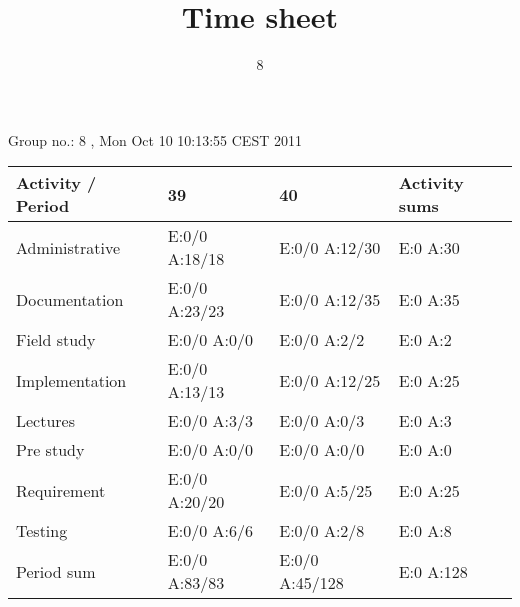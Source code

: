 \documentclass[a4paper]{article}
\title{Time sheet}
\author{8}
\begin{document}
\begin{landscape}
\begin{center}
	Group no.: 8
	, Mon Oct 10 10:13:55 CEST 2011

	\begin{tabular}{| l | l | l | l |}
		\hline
		Activity / Period & 39 & 40 & Activity sums \\
		\hline \hline
		
Administrative & E:0/0 A:18/18 & E:0/0 A:12/30 & E:0 A:30 \\
Documentation & E:0/0 A:23/23 & E:0/0 A:12/35 & E:0 A:35 \\
Field study & E:0/0 A:0/0 & E:0/0 A:2/2 & E:0 A:2 \\
Implementation & E:0/0 A:13/13 & E:0/0 A:12/25 & E:0 A:25 \\
Lectures & E:0/0 A:3/3 & E:0/0 A:0/3 & E:0 A:3 \\
Pre study & E:0/0 A:0/0 & E:0/0 A:0/0 & E:0 A:0 \\
Requirement & E:0/0 A:20/20 & E:0/0 A:5/25 & E:0 A:25 \\
Testing & E:0/0 A:6/6 & E:0/0 A:2/8 & E:0 A:8 \\
Period sum & E:0/0 A:83/83 & E:0/0 A:45/128 & E:0 A:128 \\
		\hline
	\end{tabular}
\end{center}
\end{landscape}
\end{document}
